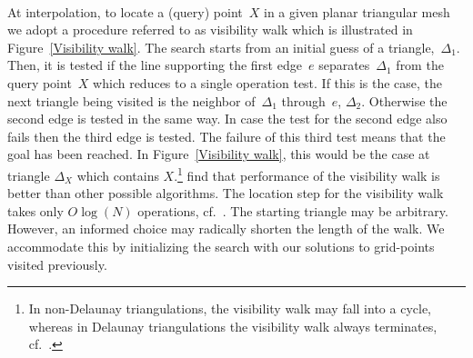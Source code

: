 \documentclass[a4paper,12pt]{article}%
\begin{document}
\begin{figure}[htb]
\begin{tabular}
 \\
\end{tabular}
\label{Delaunay Triangulation Computational}
\end{figure}

At interpolation, to locate a (query) point~$X$ in a given planar triangular mesh we adopt a procedure referred to as visibility walk which is illustrated in Figure~\ref{Visibility walk}. The search starts from an initial guess of a triangle,~$\Delta_{1}$. Then, it is tested if the line supporting the first edge~$e$ separates~$\Delta_{1}$ from the query point~$X$ which reduces to a single operation test. If this is the case, the next triangle being visited is the neighbor of~$\Delta_{1}$ through~$e$, $\Delta_{2}$. Otherwise the second edge is tested in the same way. In case the test for the second edge also fails then the third edge is tested. The failure of this third test means that the goal has been reached. In Figure~\ref{Visibility walk}, this would be the case at triangle $\Delta_{X}$ which contains $X$.\footnote{In non-Delaunay triangulations, the visibility walk may fall into a cycle, whereas in Delaunay triangulations the visibility walk always terminates, cf.~.}
 find that performance of the visibility walk is better than other possible algorithms. The location step for the visibility walk takes only $O\log\left(N\right)$ operations, cf.~. The starting triangle may be arbitrary. However, an informed choice may radically shorten the length of the walk. We accommodate this by initializing the search with our solutions to grid-points visited previously.
\end{document}
